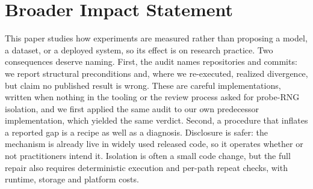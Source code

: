 \section*{Broader Impact Statement}

This paper studies how experiments are measured rather than proposing a model,
a dataset, or a deployed system, so its effect is on research practice. Two
consequences deserve naming. First, the audit names repositories and commits:
we report structural preconditions and, where we re-executed, realized
divergence, but claim no published result is wrong. These are careful
implementations, written when nothing in the tooling or the review process
asked for probe-RNG isolation, and we first applied the same audit to our own
predecessor implementation, which yielded the same verdict. Second, a procedure that inflates a reported
gap is a recipe as well as a diagnosis. Disclosure is safer: the mechanism is
already live in widely used released code, so it operates whether or not
practitioners intend it. Isolation is often a small code change, but the full
repair also requires deterministic execution and per-path repeat checks,
with runtime, storage and platform costs.
